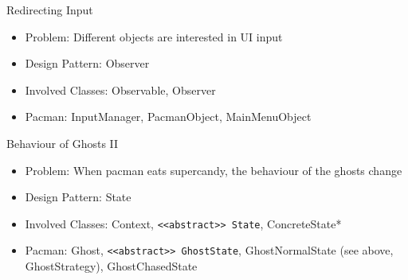 \documentclass[10pt,t,a4paper]{beamer}
\begin{document}
\begin{frame}[label={sec:orgheadline8}]{Redirecting Input}
\begin{itemize}
\item Problem: Different objects are interested in UI input
\item Design Pattern: Observer
\item Involved Classes: Observable, Observer
\item Pacman: InputManager, PacmanObject, MainMenuObject
\end{itemize}
\end{frame}
\begin{frame}[fragile,label={sec:orgheadline9}]{Behaviour of Ghosts II}
 \begin{itemize}
\item Problem: When pacman eats supercandy, the behaviour of the ghosts change
\item Design Pattern: State
\item Involved Classes: Context, \texttt{<<abstract>> State}, ConcreteState*
\item Pacman: Ghost, \texttt{<<abstract>> GhostState}, GhostNormalState (see above, GhostStrategy), GhostChasedState
\end{itemize}
\end{frame}
\end{document}
